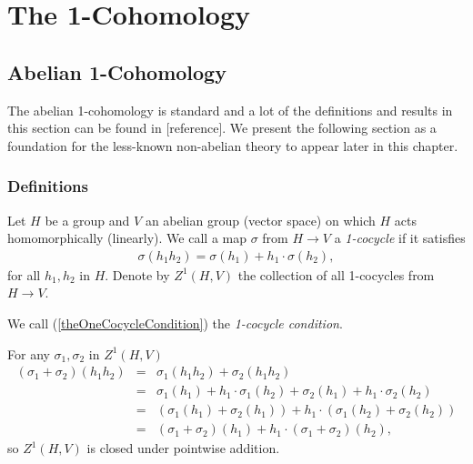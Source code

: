 
\chapter{The 1-Cohomology}
\label{Chapter3}

\section{Abelian 1-Cohomology}
The abelian 1-cohomology is standard and a lot of the definitions and results in this section can be found in [reference]. We present the following section as a foundation for the less-known non-abelian theory to appear later in this chapter.	
\subsection{Definitions}
Let $H$ be a group and $V$ an abelian group (vector space) on which $H$ acts homomorphically (linearly). We call a map $\sigma$ from $H\rightarrow V$ a  \emph{1-cocycle} if it satisfies
\begin{eqnarray}\label{theOneCocycleCondition}
	\sigma(h_1h_2) = \sigma(h_1) + h_1\cdot\sigma(h_2),
\end{eqnarray}
for all $h_1, h_2$ in $H$. Denote by $Z^1\left( H, V \right)$ the collection of all 1-cocycles from $H\rightarrow V$.

We call (\ref{theOneCocycleCondition}) the \emph{1-cocycle condition}.

For any $\sigma_1, \sigma_2$ in $Z^1\left(H, V\right)$
\begin{eqnarray*}
	\left(\sigma_1 + \sigma_2\right)(h_1h_2) &=& \sigma_1(h_1h_2) +  \sigma_2(h_1h_2) \\
	&=& \sigma_1(h_1) + h_1\cdot\sigma_1(h_2) +  \sigma_2(h_1) + h_1\cdot\sigma_2(h_2)\\
	&=& \left( \sigma_1(h_1) + \sigma_2(h_1) \right) + h_1\cdot\left(\sigma_1(h_2) + \sigma_2(h_2)\right) \\
	&=& \left(\sigma_1+\sigma_2\right)(h_1) + h_1\cdot\left(\sigma_1 + \sigma_2\right)(h_2),
\end{eqnarray*}
so $Z^1(H, V)$ is closed under pointwise addition.

